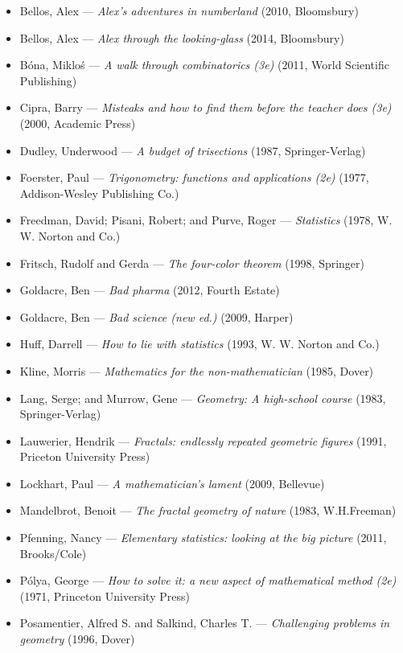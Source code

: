 \begin{itemize}[noitemsep]
  \item Bellos, Alex --- \emph{Alex's adventures in numberland} (2010, Bloomsbury)
  \item Bellos, Alex --- \emph{Alex through the looking-glass} (2014, Bloomsbury)
  \item B\'ona, Miklo\'s --- \emph{A walk through combinatorics (3e)} (2011, World Scientific Publishing)
  \item Cipra, Barry --- \emph{Misteaks and how to find them before the teacher does (3e)} (2000, Academic Press)
  \item Dudley, Underwood --- \emph{A budget of trisections} (1987, Springer-Verlag)
  \item Foerster, Paul --- \emph{Trigonometry: functions and applications (2e)} (1977, Addison-Wesley Publishing Co.)
  \item Freedman, David; Pisani, Robert; and Purve, Roger --- \emph{Statistics} (1978, W. W. Norton and Co.)
  \item Fritsch, Rudolf and Gerda --- \emph{The four-color theorem} (1998, Springer)
  \item Goldacre, Ben --- \emph{Bad pharma} (2012, Fourth Estate)
  \item Goldacre, Ben --- \emph{Bad science (new ed.)} (2009, Harper)
  \item Huff, Darrell --- \emph{How to lie with statistics} (1993, W. W. Norton and Co.)
  \item Kline, Morris --- \emph{Mathematics for the non-mathematician} (1985, Dover)
  \item Lang, Serge; and Murrow, Gene --- \emph{Geometry: A high-school course} (1983, Springer-Verlag)
  \item Lauwerier, Hendrik --- \emph{Fractals: endlessly repeated geometric figures} (1991, Priceton University Press)
  \item Lockhart, Paul --- \emph{A mathematician's lament} (2009, Bellevue)
  \item Mandelbrot, Benoit --- \emph{The fractal geometry of nature} (1983, W.H.Freeman)
  \item Pfenning, Nancy --- \emph{Elementary statistics: looking at the big picture} (2011, Brooks/Cole)
  \item P\'olya, George --- \emph{How to solve it: a new aspect of mathematical method (2e)} (1971, Princeton University Press)
  \item Posamentier, Alfred S. and Salkind, Charles T. --- \emph{Challenging problems in geometry} (1996, Dover)

\end{itemize}
